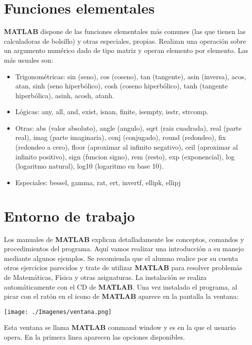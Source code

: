 \section{Funciones elementales}

\textbf{MATLAB} dispone de las funciones elementales más comunes (las que tienen las calculadoras de bolsillo) y otras especiales, propias. Realizan una operación sobre un argumento numérico dado de tipo matriz y operan elemento por elemento. Las más usuales son:
\begin{itemize}
\item Trigonométricas: sin (seno), cos (coseno), tan (tangente), asin (inversa), acos, atan, sinh (seno hiperbólico), cosh (coseno hiperbólico), tanh (tangente hiperbólica), asinh, acosh, atanh.
\item Lógicas: any, all, and, exist, isnan, finite, isempty, isstr, strcomp.
\item Otras: abs (valor absoluto), angle (angulo), sqrt (raiz cuadrada), real (parte real), imag (parte imaginaria), conj (conjugado), round (redondeo), fix (redondeo a cero), floor (aproximar al infinito negativo), ceil (aproximar al infinito positivo), sign (funcion signo), rem (resto), exp (exponencial), log (logaritmo natural), log10 (logaritmo en base 10).
\item Especiales: bessel, gamma, rat, ert, invertf, ellipk, ellipj
\end{itemize}



\section{Entorno de trabajo}

Los manuales de \textbf{MATLAB} explican detalladamente los conceptos, comandos y procedimientos del programa. Aquí vamos realizar una introducción a su manejo mediante algunos ejemplos. Se recomienda que el alumno realice por su cuenta otros ejercicios parecidos y trate de utilizar \textbf{MATLAB} para resolver problemás de Matemáticas, Física y otras asignaturas. La instalación se realiza automáticamente con el CD de \textbf{MATLAB}. Una vez instalado el programa, al picar con el ratón en el icono de \textbf{MATLAB} aparece en la pantalla la ventana:

\texttt{[image: ./Imagenes/ventana.png]} 

Esta ventana se llama \textbf{MATLAB} command window y es en la que el usuario opera. En la primera linea aparecen las opciones disponibles.